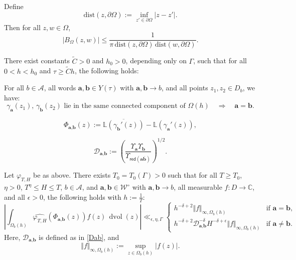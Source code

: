 \documentclass[10pt,a4paper]{amsart}
\DeclareMathOperator{\dvol}{dvol}
\newcommand{\Aa}{\textbf{a}}
\newcommand{\Bb}{\textbf{b}}
\newcommand{\CC}{\mathbb{C}}
\begin{document}
\begin{lemma}\label{lem:UpperBoundBergman}
Define
\[
\mathrm{dist}(z, \partial\Omega) := \inf_{z' \in \partial\Omega} |z - z'|.
\]
Then for all $z, w \in \Omega$,
\begin{equation}\label{UpperBoundBergmanineq}
|B_\Omega(z,w)| \le \frac{1}{\pi \, \mathrm{dist}(z, \partial\Omega) \, \mathrm{dist}(w, \partial\Omega)}.
\end{equation}
\end{lemma}

\begin{lemma}\label{lem:separation}
There exist constants $\widetilde{C} > 0$ and $h_0 > 0$, depending only on $\Gamma$, such that for all $0 < h < h_0$ and $\tau \ge \widetilde{C} h$, the following holds:

For all $b \in \mathcal{A}$, all words $\Aa, \Bb \in Y(\tau)$ with $\Aa, \Bb \to b$, and all points $z_1, z_2 \in D_b$, we have:
\[
\gamma_{\Aa}(z_1),\, \gamma_{\Bb}(z_2) \text{ lie in the same connected component of } \Omega(h) \quad \Longrightarrow \quad \Aa = \Bb.
\]
\end{lemma}

\begin{equation}\label{phase}
\Phi_{\Aa, \Bb}(z) := \overline{\mathbb{L}(\gamma_{\Bb}'(z))} -\mathbb{L}(\gamma_{\Aa}'(z)),
\end{equation}

\begin{equation}\label{Dab}
\mathcal{D}_{\Aa, \Bb} := \left( \frac{\Upsilon_{\Aa} \Upsilon_{\Bb}}{\Upsilon_{\mathsf{red}(\Aa \overline{\Bb})}} \right)^{1/2}.
\end{equation}

\begin{prop}\label{prop:FOURIER} Let $\varphi_{T,H}$ be as above. There exists $T_0 = T_0(\Gamma) > 0$ such that for all $T \ge T_0$, $\eta > 0$, $T^\eta \le H \le T$, $b \in \mathcal{A}$, and $\Aa, \Bb \in \mathcal{W}^\circ$ with $\Aa, \Bb \to b$, all measurable $f \colon D \to \CC$, and all $\epsilon > 0$, the following holds with $h := \frac{1}{T}$:
\[
\left\vert \int_{\Omega_b(h)} \widehat{\varphi_{T,H}}\left(\Phi_{\Aa,\Bb}(z)\right) f(z)\, \dvol(z) \right\vert \ll_{\epsilon,\eta,\Gamma} 
\begin{cases}
h^{-\delta + 2} \Vert f \Vert_{\infty, \Omega_b(h)} & \text{if } \Aa = \Bb, \\[0.5em]
h^{-\delta + 2} \mathcal{D}_{\Aa, \Bb}^{-\delta} H^{-\delta + \epsilon} \Vert f \Vert_{\infty, \Omega_b(h)} & \text{if } \Aa \neq \Bb.
\end{cases}
\]
Here, $\mathcal{D}_{\Aa, \Bb}$ is defined as in \eqref{Dab}, and
\[
\Vert f \Vert_{\infty, \Omega_b(h)} := \sup_{z \in \Omega_b(h)} \vert f(z) \vert.
\]
\end{prop}
\end{document}
